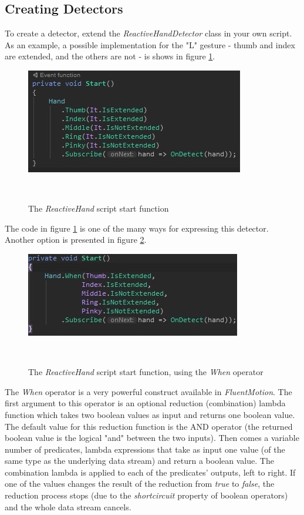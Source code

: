 \documentclass[chi_draft]{sigchi}
\def\fluentmotion{\textit{FluentMotion}}
\begin{document}
\subsection{Creating Detectors}

To create a detector, extend the \textit{ReactiveHandDetector} class in your own script. As an example, a possible implementation for the "L" gesture - thumb and index are extended, and the others are not - is shows in figure \ref{fig:figure8}.

\begin{figure}[h]
  \centering
  \includegraphics[width=0.9\columnwidth]{figures/FluentMotion_script}
  \caption{The \textit{ReactiveHand} script start function}~\label{fig:figure8}
\end{figure}

The code in figure \ref{fig:figure8} is one of the many ways for expressing this detector. Another option is presented in figure \ref{fig:figure9}.

\begin{figure}[H]
  \centering
  \includegraphics[width=0.9\columnwidth]{figures/FluentMotion_script_alternative}
  \caption{The \textit{ReactiveHand} script start function, using the \textit{When} operator}~\label{fig:figure9}
\end{figure}

The \textit{When} operator is a very powerful construct available in \fluentmotion{}. The first argument to this operator is an optional reduction (combination) lambda function which takes two boolean values as input and returns one boolean value. The default value for this reduction function is the AND operator (the returned boolean value is the logical "and" between the two inputs). Then comes a variable number of predicates, lambda expressions that take as input one value (of the same type as the underlying data stream) and return a boolean value. The combination lambda is applied to each of the predicates' outputs, left to right. If one of the values changes the result of the reduction from \textit{true} to \textit{false}, the reduction process stops (due to the \textit{shortcircuit} property of boolean operators) and the whole data stream cancels.
\end{document}
